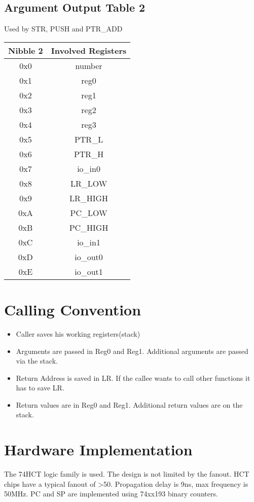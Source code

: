 \documentclass[a4paper, 12pt]{article}
\begin{document}
	\subsection{Argument Output Table 2}
	Used by STR, PUSH and PTR\_ADD
	\begin{center}
		\begin{tabular}{|c|c|}
			\hline
			Nibble 2 & Involved Registers \\ \hline
			0x0 & number \\ \hline
			0x1 & reg0 \\ \hline
			0x2 & reg1 \\ \hline
			0x3 & reg2 \\ \hline
			0x4 & reg3 \\ \hline
			0x5 & PTR\_L \\ \hline
			0x6 & PTR\_H \\ \hline
			0x7 & io\_in0 \\ \hline
			0x8 & LR\_LOW \\ \hline
			0x9 & LR\_HIGH \\ \hline
			0xA & PC\_LOW \\ \hline
			0xB & PC\_HIGH \\ \hline
			0xC & io\_in1 \\ \hline
			0xD & io\_out0 \\ \hline
			0xE & io\_out1 \\ \hline
		\end{tabular}
	\end{center}
	\section{Calling Convention}
	\begin{itemize}
		\item Caller saves his working registers(stack)
		\item Arguments are passed in Reg0 and Reg1. Additional arguments are passed via the stack.
		\item Return Address is saved in LR. If the callee wants to call other functions it has to save LR.
		\item Return values are in Reg0 and Reg1. Additional return values are on the stack.
	\end{itemize}
	\section{Hardware Implementation}
	The 74HCT logic family is used. The design is not limited by the fanout. HCT chips have a typical fanout of \textgreater 50. Propagation delay is 9ns, max frequency is 50MHz.
	PC and SP are implemented using 74xx193 binary counters.
\end{document}
